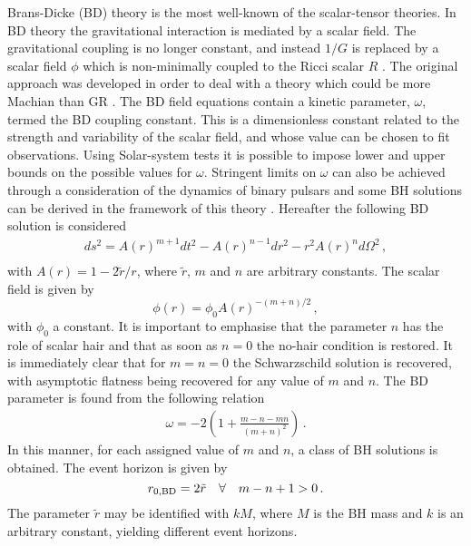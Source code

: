 \documentclass[a4paper,aps,twocolumn,showpacs,showkeys,nofootinbib,preprintnumbers,superscriptaddress,amsmath,amssymb,amsfonts]{revtex4-1}
\begin{document}
Brans-Dicke (BD) theory is the most well-known of the scalar-tensor theories.
In BD theory the gravitational interaction is mediated by a scalar field.  The
gravitational coupling is no longer constant, and instead $1/G$ is
replaced by a scalar field $\phi$ which is non-minimally coupled to the
Ricci scalar $R$ \cite{Brans1961}. The original approach was developed in
order to deal with a theory which could be more {Machian} than GR
\cite{Brans1961}. 
The BD field equations contain
a kinetic parameter, $\omega$, termed the BD coupling
constant. This is a dimensionless constant related to the strength and
variability of the scalar field, and whose value can be chosen to fit
observations. Using Solar-system tests it is possible to impose lower and
upper bounds on the possible values for $\omega$. Stringent limits on
$\omega$ can also be achieved through a consideration of the dynamics of
binary pulsars and some BH solutions can be derived in the framework of
this theory \cite{Damour1988,Damour1998, Thorne1971, Kim1999}. 
Hereafter the following BD solution is considered
%
\begin{eqnarray}
ds^2 = A(r)^{m+1} dt^2 - A(r)^{n-1} dr^2 - r^2 A(r)^n d\Omega^2 \,,
\nonumber\\
\label{BD}
\end{eqnarray}
%
with $\displaystyle{A(r)=1-{2{\tilde r}}/{r}}$, where $\tilde r$, $m$
and $n$ are arbitrary constants. The scalar field is given by
%
\begin{equation}
\phi(r) = \phi_0 A(r)^{-(m+n)/2} \,,
\end{equation}
%
with $\phi_0$ a constant. It is important to emphasise that the parameter
$n$ has the role of scalar hair and that as soon as $n=0$ the no-hair
condition is restored. It is immediately clear that for $m=n=0$ the
Schwarzschild solution is recovered, with asymptotic flatness being
recovered for any value of $m$ and $n$. The BD
parameter is found from the following relation
%
\begin{eqnarray}
\omega = -2 \left( 1 + \frac{m - n - mn}{(m+n)^2} \right) \,.
\label{omega}
\end{eqnarray}
%
In this manner, for each assigned value of $m$ and $n$, a class of BH
solutions is obtained. The event horizon is given by
%
\begin{equation}
r_{0,{{\rm BD}}} = 2{\tilde r} \label{BDEH} \quad \forall \quad m-n+1>0 \,.
\end{equation}
%
The parameter ${\tilde r}$ may be identified with $k M$, where $M$ is the BH mass
and $k$ is an arbitrary constant, yielding different event horizons.
\end{document}
